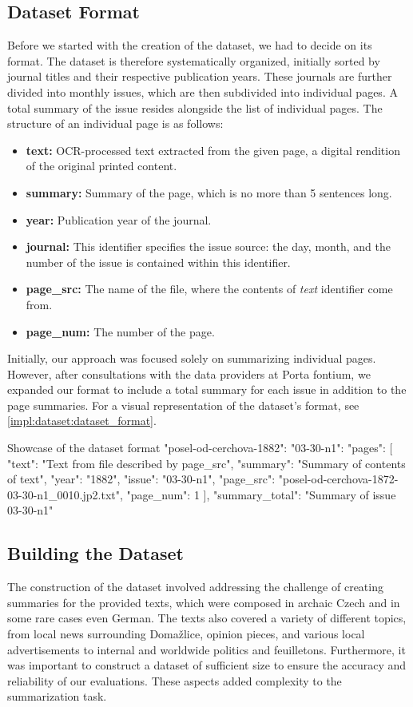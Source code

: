 \documentclass[english, ba, kiv, he, iso690numb, pdf, viewonly]{fasthesis}
\begin{document}
\subsection{Dataset Format}
Before we started with the creation of the dataset, we had to decide on its format.
The dataset is therefore systematically organized, initially sorted by journal titles and their respective publication years. These journals are further divided into monthly issues, which are then subdivided into individual pages. A total summary of the issue resides alongside the list of individual pages. The structure of an individual page is as follows:
\begin{itemize}
    \item \textbf{text:} OCR-processed text extracted from the given page, a digital rendition of the original printed content.
    \item \textbf{summary:} Summary of the page, which is no more than 5 sentences long.
    \item \textbf{year:} Publication year of the journal.
    \item \textbf{journal:} This identifier specifies the issue source: the day, month, and the number of the issue is contained within this identifier.
    \item \textbf{page\_src:} The name of the file, where the contents of \textit{text} identifier come from.
    \item \textbf{page\_num:} The number of the page.
\end{itemize}
Initially, our approach was focused solely on summarizing individual pages. However, after consultations with the data providers at Porta fontium, we expanded our format to include a total summary for each issue in addition to the page summaries. For a visual representation of the dataset's format, see \ref{impl:dataset:dataset_format}. 
\begin{code}{}{Showcase of the dataset format\label{impl:dataset:dataset_format}}
{
  "posel-od-cerchova-1882": {
    "03-30-n1": {
      "pages": [
        {
          "text": "Text from file described by page_src",
          "summary": "Summary of contents of text",
          "year": "1882",
          "issue": "03-30-n1",
          "page_src": "posel-od-cerchova-1872-03-30-n1_0010.jp2.txt",
          "page_num": 1
        }
      ],
      "summary_total": "Summary of issue 03-30-n1"
    }
  }
}
\end{code}
\subsection{Building the Dataset}
The construction of the dataset involved addressing the challenge of creating summaries for the provided texts, which were composed in archaic Czech and in some rare cases even German. The texts also covered a variety of different topics, from local news surrounding Domažlice, opinion pieces, and various local advertisements to internal and worldwide politics and feuilletons. Furthermore, it was important to construct a dataset of sufficient size to ensure the accuracy and reliability of our evaluations. These aspects added complexity to the summarization task. 
\end{document}

